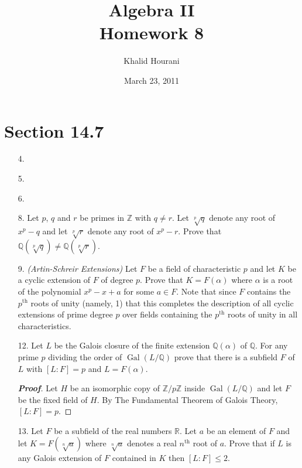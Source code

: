 \documentclass[12pt,leqno]{article}
\title{Algebra II\\\large Homework 8}
\date{March 23, 2011}
\author{Khalid Hourani}
\theoremstyle{definition}
\newcommand{\Gal}{\operatorname{Gal}}
\newcommand{\Z}{\mathbb{Z}}
\newcommand{\Q}{\mathbb{Q}}
\newcommand{\R}{\mathbb{R}}
\newcommand{\+}{\oplus}
\newenvironment{Proof}{\begin{proof}[\textnormal{\textbf{Proof}}]}{\end{proof}}
\begin{document}
 \begin{titlepage}
  \maketitle
 \end{titlepage}

\section*{Section 14.7}
  \begin{enumerate}
   \item [4.] 
   \item [5.]
   \item [6.]
   \item [8.] Let $p$, $q$ and $r$ be primes in $\Z$ with $q\not=r$. Let $\sqrt[p]{q}$ denote any root of $x^p-q$ and let $\sqrt[p]{r}$ denote any root of $x^p-r$. Prove that $\Q(\sqrt[p]{q})\not=\Q(\sqrt[p]{r})$.
   \item [9.] \textit{(Artin-Schreir Extensions)} Let $F$ be a field of characteristic $p$ and let $K$ be a cyclic extension of $F$ of degree $p$. Prove that $K=F(\alpha)$ where $\alpha$ is a root of the polynomial $x^p-x+a$ for some $a\in F$. Note that since $F$ contains the $p^{\text{th}}$ roots of unity (namely, 1) that this completes the description of all cyclic extensions of prime degree $p$ over fields containing the $p^{\text{th}}$ roots of unity in all characteristics. 
   \item [12.] Let $L$ be the Galois closure of the finite extension $\Q(\alpha)$ of $\Q$. For any prime $p$ dividing the order of $\Gal(L/\Q)$ prove that there is a subfield $F$ of $L$ with $[L:F]=p$ and $L=F(\alpha)$.
   \begin{Proof}
   Let $H$ be an isomorphic copy of $\Z/p\Z$ inside $\Gal(L/\Q)$ and let $F$ be the fixed field of $H$. By The Fundamental Theorem of Galois Theory, $[L:F]=p$. 
   \end{Proof}
   \item [13.] Let $F$ be a subfield of the real numbers $\R$. Let $a$ be an element of $F$ and let $K=F(\sqrt[n]{a})$ where $\sqrt[n]{a}$ denotes a real $n^{\text{th}}$ root of $a$. Prove that if $L$ is any Galois extension of $F$ contained in $K$ then $[L:F]\leq2$.
  \end{enumerate}
\end{document}
